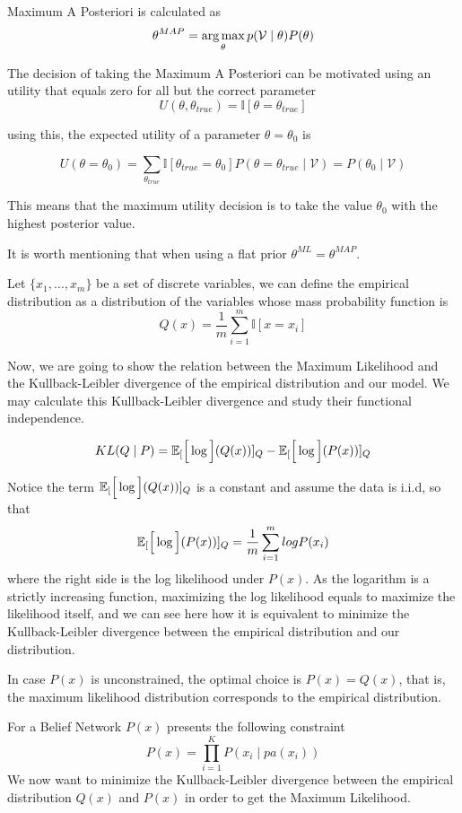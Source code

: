 \begin{definition}
  Maximum A Posteriori is calculated as
  \[
    \theta^{MAP} = \operatorname*{arg\,max}_\theta p(\mathcal{V} \mid \theta)P(\theta)
  \]
\end{definition}

The decision of taking the Maximum A Posteriori can be motivated using an
utility that equals zero for all but the correct parameter
\[
  U(\theta, \theta_{true}) = \mathbb{I}[\theta = \theta_{true}]
\]

using this, the expected utility of a parameter \(\theta = \theta_0\) is

\[
  U(\theta = \theta_0) = \sum_{\theta_{true}}\mathbb{I}[\theta_{true} = \theta_0]P(\theta = \theta_{true}  \mid  \mathcal{V}) = P(\theta_0  \mid  \mathcal{V})
\]

This means that the maximum utility decision is to take the value \(\theta_0\)
with the highest posterior value.


It is worth mentioning that when using a flat prior \(\theta^{ML}
= \theta ^{MAP}\).


Let \(\{x_1, \dots, x_m\}\) be a set of discrete variables, we can define the
empirical distribution as a distribution of the variables whose mass probability
function is
\[
  Q(x) = \frac{1}{m}\sum_{i = 1}^m \mathbb{I}[x = x_i]
\]

Now, we are going to show the relation between the Maximum Likelihood and the
Kullback-Leibler divergence of the empirical distribution and our model. We may calculate this Kullback-Leibler divergence and study their functional independence.

\[
  KL(Q \mid P) = \mathbb{E}_{[}\Big[\log\Big](Q(x))]_{Q} - \mathbb{E}_{[}\Big[\log\Big](P(x))]_Q
\]

Notice the term \(\mathbb{E}_{[}\Big[\log\Big](Q(x))]_{Q} \) is a constant and assume the data is i.i.d, so that
\[
   \mathbb{E}_{[}\Big[\log\Big](P(x))]_Q = \frac{1}{m}\sum_{i = 1}^mlogP(x_i)
 \]
 where the right side is the log likelihood under \(P(x)\). As the logarithm is
 a strictly increasing function, maximizing the log likelihood equals to
 maximize the likelihood itself, and we can see here how it is equivalent to
 minimize the Kullback-Leibler divergence between the empirical distribution and
 our distribution.

 In case \(P(x)\) is unconstrained, the optimal choice is \(P(x) = Q(x)\), that
 is, the maximum likelihood distribution corresponds to the empirical distribution.

 For a Belief Network \(P(x)\) presents the following constraint
 \[
   P(x) = \prod_{i = 1}^K P(x_i  \mid  pa(x_i))
 \]
 We now want to minimize the Kullback-Leibler divergence between the empirical
 distribution \(Q(x)\) and \(P(x)\) in order to get the Maximum Likelihood.


